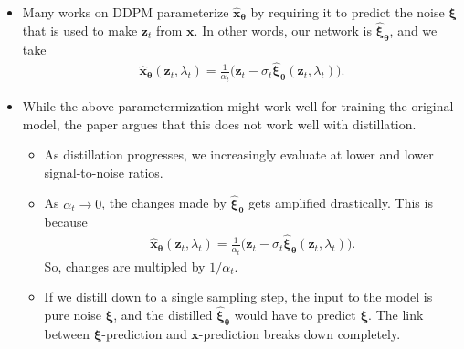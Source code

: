 \documentclass[10pt]{article}
\newcommand{\ve}[1]{\mathbf{#1}}
\newcommand{\ves}[1]{\boldsymbol{#1}}
\begin{document}
\begin{itemize}
  \item Many works on DDPM parameterize $\hat{\ve{x}}_{\ves{\theta}}$ by requiring it to predict the noise $\ves{\xi}$ that is used to make $\ve{z}_t$ from $\ve{x}$. In other words, our network is $\hat{\ves{\xi}}_{\ves{\theta}}$, and we take
  \begin{align*}
    \hat{\ve{x}}_{\ves{\theta}}(\ve{z}_t, \lambda_t) = \frac{1}{\alpha_t}\big(\ve{z}_t - \sigma_t \hat{\ves{\xi}}_{\ves{\theta}}(\ve{z}_t, \lambda_t)\big).
  \end{align*}
  
  \item While the above parametermization might work well for training the original model, the paper argues that this does not work well with distillation.
  \begin{itemize}
    \item As distillation progresses, we increasingly evaluate at lower and lower signal-to-noise ratios.
    
    \item As $\alpha_t \rightarrow 0$, the changes made by $\hat{\ves{\xi}}_{\ves{\theta}}$ gets amplified drastically. This is because
    \begin{align*}
      \hat{\ve{x}}_{\ves{\theta}}(\ve{z}_t, \lambda_t) = \frac{1}{\alpha_t}\big(\ve{z}_t - \sigma_t \hat{\ves{\xi}}_{\ves{\theta}}(\ve{z}_t, \lambda_t)\big).
    \end{align*}
    So, changes are multipled by $1 / \alpha_t$.

    \item If we distill down to a single sampling step, the input to the model is pure noise $\ves{\xi}$, and the distilled $\hat{\ves{\xi}}_{\ves{\theta}}$ would have to predict $\ves{\xi}$. The link between $\ves{\xi}$-prediction and $\ve{x}$-prediction breaks down completely.
  \end{itemize}


\end{itemize}
\end{document}
